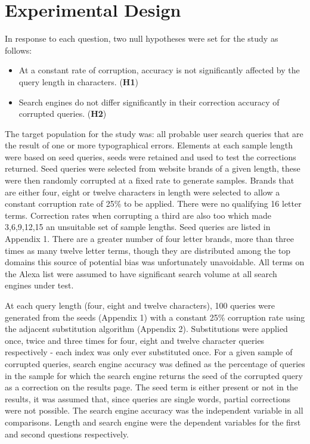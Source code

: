 \documentclass{csfourzero}
\begin{document}
\section{Experimental Design}
\label{sec:exp}

In response to each question, two null hypotheses were set for the study as follows:
\begin{itemize}
  \item{At a constant rate of corruption, accuracy is not significantly affected by the query length in characters. (\textbf{H1})}
  \item{Search engines do not differ significantly in their correction accuracy of corrupted queries. (\textbf{H2})}
\end{itemize}

\noindent
The target population for the study was: all probable user search queries that are the result of one or more typographical errors. Elements at each sample length were based on seed queries, seeds were retained and used to test the corrections returned. Seed queries were selected from website brands of a given length, these were then randomly corrupted at a fixed rate to generate samples. Brands that are either four, eight or twelve characters in length were selected to allow a constant corruption rate of 25\% to be applied. There were no qualifying 16 letter terms. Correction rates when corrupting a third are also too which made 3,6,9,12,15 an unsuitable set of sample lengths. Seed queries are listed in Appendix 1. There are a greater number of four letter brands, more than three times as many twelve letter terms, though they are distributed among the top domains this source of potential bias was unfortunately unavoidable. All terms on the Alexa list were assumed to have significant search volume at all search engines under test.

At each query length (four, eight and twelve characters), 100 queries were generated from the seeds (Appendix 1) with a constant 25\% corruption rate using the adjacent substitution algorithm (Appendix 2). Substitutions were applied once, twice and three times for four, eight and twelve character queries respectively - each index was only ever substituted once. For a given sample of corrupted queries, search engine accuracy was defined as the percentage of queries in the sample for which the search engine returns the seed of the corrupted query as a correction on the results page. The seed term is either present or not in the results, it was assumed that, since queries are single words, partial corrections were not possible. The search engine accuracy was the independent variable in all comparisons. Length and search engine were the dependent variables for the first and second questions respectively.
\end{document}
